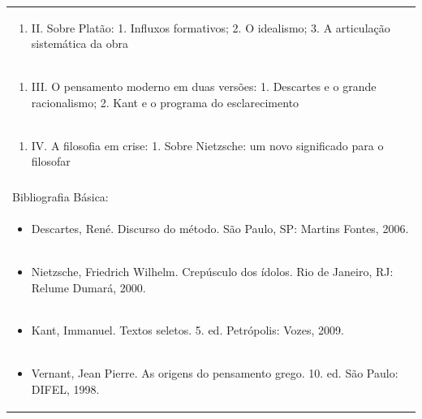 \documentclass[11pt]{article}
\begin{document}
\begin{center}
\begin{longtable}{|p{4cm}|p{4cm}|p{4cm}|p{4cm}|}
\multicolumn{4}{|p{\dimexpr 16cm + 6\tabcolsep\relax}|}{\begin{enumerate}[start=2]\item II. Sobre Platão: 1. Influxos formativos; 2. O idealismo; 3. A articulação sistemática da obra\end{enumerate}}\\
\multicolumn{4}{|p{\dimexpr 16cm + 6\tabcolsep\relax}|}{\begin{enumerate}[start=3]\item III. O pensamento moderno em duas versões: 1. Descartes e o grande racionalismo; 2. Kant e o programa do esclarecimento\end{enumerate}}\\
\multicolumn{4}{|p{\dimexpr 16cm + 6\tabcolsep\relax}|}{\begin{enumerate}[start=4]\item IV. A filosofia em crise: 1. Sobre Nietzsche: um novo significado para o filosofar\end{enumerate}}\\
\multicolumn{4}{|p{\dimexpr 16cm + 6\tabcolsep\relax}|}{}\\
\hline
\multicolumn{4}{|p{16cm}|}{Bibliografia Básica:}\\*
\multicolumn{4}{|p{\dimexpr 16cm + 6\tabcolsep\relax}|}{\begin{itemize}\item Descartes, René. Discurso do método. São Paulo, SP: Martins Fontes, 2006.\end{itemize}}\\
\multicolumn{4}{|p{\dimexpr 16cm + 6\tabcolsep\relax}|}{\begin{itemize}\item Nietzsche, Friedrich Wilhelm. Crepúsculo dos ídolos. Rio de Janeiro, RJ: Relume Dumará, 2000.\end{itemize}}\\
\multicolumn{4}{|p{\dimexpr 16cm + 6\tabcolsep\relax}|}{\begin{itemize}\item Kant, Immanuel. Textos seletos. 5. ed. Petrópolis: Vozes, 2009.\end{itemize}}\\
\multicolumn{4}{|p{\dimexpr 16cm + 6\tabcolsep\relax}|}{\begin{itemize}\item Vernant, Jean Pierre. As origens do pensamento grego. 10. ed. São Paulo: DIFEL, 1998.\end{itemize}}\\

\end{longtable}
\end{center}
\end{document}
